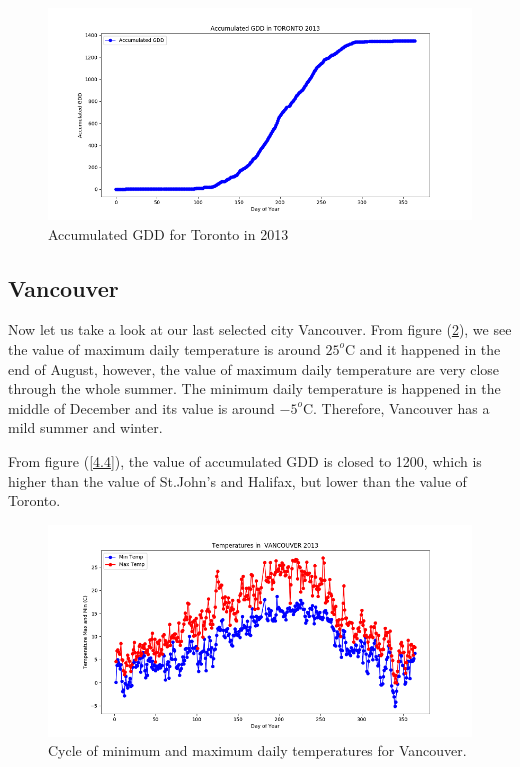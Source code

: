 \documentclass[12pt]{article}
\begin{document}
\begin{figure}[H]
\includegraphics[width=5.25in]{Plot/toronto.png}



\caption{Accumulated GDD for Toronto in 2013}
\label{3.3}
\end{figure}





\subsection{ \bf Vancouver }
Now let us take a look at our last selected city Vancouver. From figure (\ref{4}), we see the value of maximum daily temperature is around $25^{o}$C and it happened in the end of August, however, the value of maximum daily temperature are very close through the whole summer. The minimum daily temperature is happened in the middle of December and its value is around $-5^{o}$C. Therefore, Vancouver has a mild summer and winter.


From figure (\ref{4.4}), the value of accumulated GDD is closed to 1200, which is higher than the value of St.John's and Halifax, but lower than the value of Toronto.

\begin{center}
\begin{figure}[H]
\includegraphics[width=5.25in]{Plot/VANCOUVER/day_vs_temp_2013.png}




\caption{Cycle of minimum and maximum daily temperatures for Vancouver.}
\label{4}
\end{figure}
\end{center}
\end{document}
